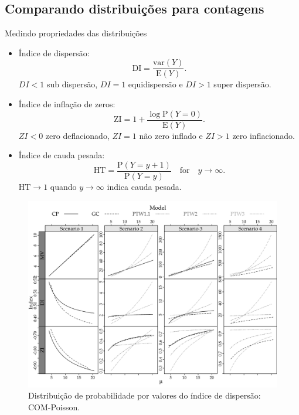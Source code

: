 \documentclass[10pt, aspectratio=169]{beamer}\usepackage[]{graphicx}\usepackage[]{color}
\begin{document}
\subsection{Comparando distribuições para contagens}
\begin{frame}{Medindo propriedades das distribuições}
\begin{itemize}

\item Índice de dispersão: $$\mathrm{DI} = \frac{\mathrm{var}(Y)}{\mathrm{E}(Y)}.$$
$ DI < 1$ sub dispersão, $DI = 1$ equidispersão e $DI > 1$ super dispersão.
\vspace{0,5cm}
\item Índice de inflação de zeros: $$\mathrm{ZI} = 1 + \frac{\log \mathrm{P}(Y = 0)}{\mathrm{E}(Y)}.$$
$ZI < 0$ zero deflacionado, $ZI=1$ não zero inflado e $ZI > 1$ zero inflacionado.
\vspace{0,5cm}
\item Índice de cauda pesada:
$$ \mathrm{HT} = \frac{\mathrm{P}(Y=y+1)}{\mathrm{P}(Y=y)}\quad \text{for} \quad y \to \infty.$$
$\mathrm{HT} \to 1$ quando $y \to \infty$ indica cauda pesada.
\end{itemize}
\end{frame}

\begin{frame}[fragile]
\begin{figure}[h]
\includegraphics[scale=0.5]{images/Compara.png}
\caption{Distribuição de probabilidade por valores do
índice de dispersão: COM-Poisson.}
\label{Fig3}
\centering
\end{figure}
\end{frame}
\end{document}
